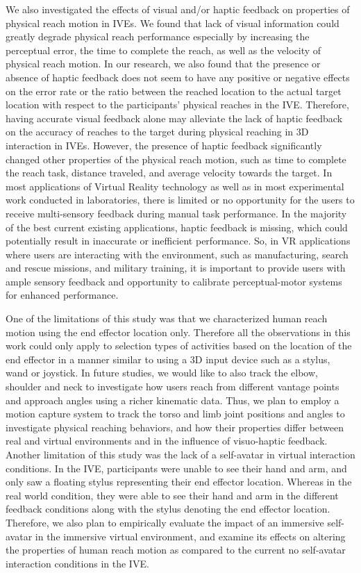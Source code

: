 We also investigated the effects of visual and/or haptic feedback on properties of physical reach motion in IVEs. We found that lack of visual information could greatly degrade physical reach performance especially by increasing the perceptual error, the time to complete the reach, as well as the velocity of physical reach motion. In our research, we also found that the presence or absence of haptic feedback does not seem to have any positive or negative effects on the error rate or the ratio between the reached location to the actual target location with respect to the participants' physical reaches in the IVE. Therefore, having accurate visual feedback alone may alleviate the lack of haptic feedback on the accuracy of reaches to the target during physical reaching in 3D interaction in IVEs. However, the presence of haptic feedback significantly changed other properties of the physical reach motion, such as time to complete the reach task, distance traveled, and average velocity towards the target. In most applications of Virtual Reality technology as well as in most experimental work conducted in laboratories, there is limited or no opportunity for the users to receive multi-sensory feedback during manual task performance. In the majority of the best current existing applications, haptic feedback is missing, which could potentially result in inaccurate or inefficient performance. So, in VR applications where users are interacting with the environment, such as manufacturing, search and rescue missions, and military training, it is important to provide users with ample sensory feedback and opportunity to calibrate perceptual-motor systems \cite{BP98} for enhanced performance. 


One of the limitations of this study was that we characterized human reach motion using the end effector location only. Therefore all the observations in this work could only apply to selection types of activities based on the location of the end effector in a manner similar to using a 3D input device such as a stylus, wand or joystick. In future studies, we would like to also track the elbow, shoulder and neck to investigate how users reach from different vantage points and approach angles using a richer kinematic data. Thus, we plan to employ a motion capture system to track the torso and limb joint positions and angles to investigate physical reaching behaviors, and how their properties differ between real and virtual environments and in the influence of visuo-haptic feedback. Another limitation of this study was the lack of a self-avatar in virtual interaction conditions. In the IVE, participants were unable to see their hand and arm, and only saw a floating stylus representing their end effector location. Whereas in the real world condition, they were able to see their hand and arm in the different feedback conditions along with the stylus denoting the end effector location. Therefore, we also plan to empirically evaluate the impact of an immersive self-avatar in the immersive virtual environment, and examine its effects on altering the properties of human reach motion as compared to the current no self-avatar interaction conditions in the IVE.







%
